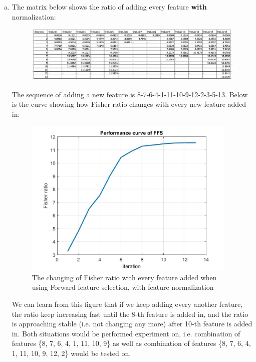 \documentclass[a4paper]{article}
\begin{document}
\begin{spacing}{2.0}
\begin{enumerate}[(1)]
\begin{itemize}
\begin{enumerate}[(a)]
\item \large{The matrix below shows the ratio of adding every feature \textbf{with} normalization:}
\normalsize
\begin{figure}[H]
\centering
\includegraphics[width = 7.5in]{NormalizetableFFS.jpg}
\label{FFS}
\end{figure}

The sequence of adding a new feature is 8-7-6-4-1-11-10-9-12-2-3-5-13.
Below is the curve showing how Fisher ratio changes with every new feature added in:
\begin{figure}[H]
\centering
\includegraphics[width = 4in]{FFSnorm.jpg}
\caption{The changing of Fisher ratio with every feature added when using Forward feature selection, with feature normalization}
\end{figure}
We can learn from this figure that if we keep adding every another feature, the ratio keep increasing fast until the 8-th feature is added in, and the ratio is approaching stable (i.e. not changing any more) after 10-th feature is added in. Both situations would be performed experiment on, i.e. combination of features \{8, 7, 6, 4, 1, 11, 10, 9\} as well as combination of features \{8, 7, 6, 4, 1, 11, 10, 9, 12, 2\} would be tested on. 

\end{enumerate}


\end{itemize}
\end{enumerate}
\end{spacing}
\end{document}

